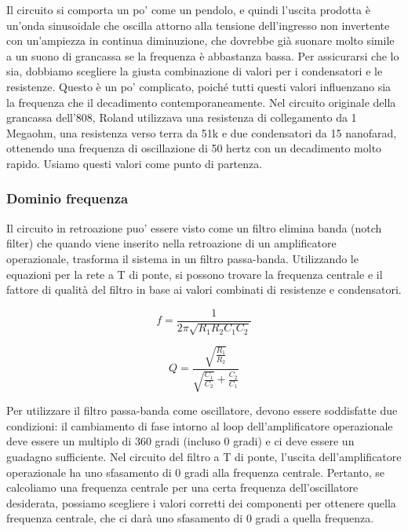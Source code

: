 \documentclass{article}
\theoremstyle{definition}
\begin{document}
Il circuito si comporta un po' come un pendolo, e quindi l'uscita prodotta è un'onda sinusoidale che oscilla attorno alla tensione dell'ingresso non invertente con un'ampiezza in continua diminuzione, che dovrebbe già suonare molto simile a un suono di grancassa se la frequenza è abbastanza bassa.
Per assicurarsi che lo sia, dobbiamo scegliere la giusta combinazione di valori per i condensatori e le resistenze.
Questo è un po' complicato, poiché tutti questi valori influenzano sia la frequenza che il decadimento contemporaneamente.
Nel circuito originale della grancassa dell'808, Roland utilizzava una resistenza di collegamento da 1 Megaohm, una resistenza verso terra da 51k e due condensatori da 15 nanofarad, ottenendo una frequenza di oscillazione di 50 hertz con un decadimento molto rapido.
Usiamo questi valori come punto di partenza. 

\subsubsection{Dominio frequenza}

Il circuito in retroazione puo' essere visto come un filtro elimina banda  (notch filter) 
che quando viene inserito nella retroazione di un amplificatore operazionale, trasforma il sistema in un filtro passa-banda. Utilizzando le equazioni per la rete a T di ponte, si possono trovare la frequenza centrale e il fattore di qualità del filtro in base ai valori combinati di resistenze e condensatori.

\begin{equation}
    f = \frac{1}{2 \pi\sqrt{R_1 R_2 C_1 C_2}}
\end{equation}

\begin{equation}
    Q = \frac{\sqrt{\frac{R_1}{R_2}}}{\sqrt{\frac{C_1}{C_2}} + {\frac{C_2}{C_1}}}
\end{equation}


Per utilizzare il filtro passa-banda come oscillatore, devono essere soddisfatte due condizioni: il cambiamento di fase intorno al loop dell'amplificatore operazionale deve essere un multiplo di 360 gradi (incluso 0 gradi) e ci deve essere un guadagno sufficiente.
Nel circuito del filtro a T di ponte, l'uscita dell'amplificatore operazionale ha uno sfasamento di 0 gradi alla frequenza centrale. Pertanto, se calcoliamo una frequenza centrale per una certa frequenza dell'oscillatore desiderata, possiamo scegliere i valori corretti dei componenti per ottenere quella frequenza centrale, che ci darà uno sfasamento di 0 gradi a quella frequenza. 
\end{document}
